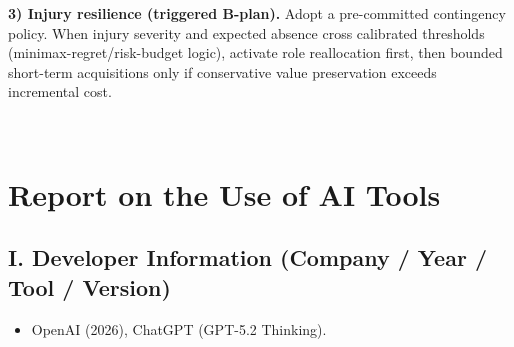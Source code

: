 \documentclass[12pt]{article}
\numberwithin{figure}{section}
\numberwithin{table}{section}
\begin{document}
\noindent\textbf{3) Injury resilience (triggered B-plan).}
Adopt a pre-committed contingency policy. When injury severity and expected absence cross calibrated thresholds (minimax-regret/risk-budget logic), activate role reallocation first, then bounded short-term acquisitions only if conservative value preservation exceeds incremental cost.

\vspace{2em}
\noindent{}\\
\noindent{}




	
	

	
	\clearpage
	\section*{Report on the Use of AI Tools}
	\small
	
	\subsection*{I. Developer Information (Company / Year / Tool / Version)}
	\begin{itemize}
		\item OpenAI (2026), ChatGPT (GPT-5.2 Thinking).
	\end{itemize}
	
\end{document}
